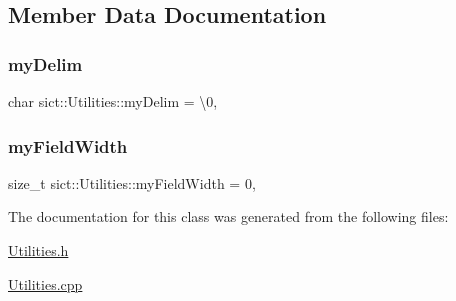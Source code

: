 \subsection{Member Data Documentation}
\mbox{\label{classsict_1_1Utilities_a1b03541cbef61c81b0b5a7197fb76f46}} 
\subsubsection{\texorpdfstring{myDelim}{myDelim}}
{\footnotesize\ttfamily char sict\+::\+Utilities\+::my\+Delim = \textquotesingle{}\textbackslash{}0\textquotesingle{}\hspace{0.3cm}{\ttfamily [static]}, {\ttfamily [private]}}

\mbox{\label{classsict_1_1Utilities_adeda8c6cf3e8bdaf19c6b3b3a011e016}} 
\subsubsection{\texorpdfstring{myFieldWidth}{myFieldWidth}}
{\footnotesize\ttfamily size\+\_\+t sict\+::\+Utilities\+::my\+Field\+Width = 0\hspace{0.3cm}{\ttfamily [static]}, {\ttfamily [private]}}



The documentation for this class was generated from the following files\+:\begin{DoxyCompactItemize}
\item 
\mbox{\hyperlink{Utilities_8h}{Utilities.\+h}}\item 
\mbox{\hyperlink{Utilities_8cpp}{Utilities.\+cpp}}\end{DoxyCompactItemize}
